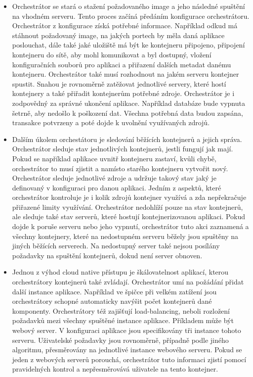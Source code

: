 \begin{itemize}
\item Orchestrátor se stará o stažení požadovaného image a jeho následné spuštění \linebreak na vhodném serveru. Tento proces začíná předáním konfigurace orchestrátoru. Orchestrátor z konfigurace získá potřebné informace. Například odkud má stáhnout požadovaný image, na jakých portech by měla daná aplikace poslouchat, dále také jaké uložiště má být ke kontejneru připojeno, připojení kontejneru \linebreak do sítě, aby mohl komunikovat a byl dostupný, vložení konfiguračních souborů pro aplikaci a přiřazení dalších metadat danému kontejneru. Orchestrátor také musí rozhodnout na jakém serveru kontejner spustit. Snahou je rovnoměrně zatěžovat jednotlivé servery, které hostí kontejnery a také přiřadit kontejnerům potřebné zdroje. Orchestrátor je i zodpovědný za správné ukončení aplikace. Například databáze bude vypnuta šetrně, aby nedošlo k poškození dat. Všechna potřebná data budou zapsána, transakce potvrzeny a poté dojde k uvolnění využívaných zdrojů.
\item Dalším úkolem orchestátoru je sledování běžících kontejnerů a jejich správa. Orchestrátor sleduje stav jednotlivých kontejnerů, jestli fungují jak mají. Pokud se například aplikace uvnitř kontejneru zastaví, kvůli chybě, orchestrátor to musí zjistit a namísto starého kontejneru vytvořit nový. Orchestrátor sleduje jednotlivé zdroje a udržuje takový stav jaký je definovaný v konfiguraci pro danou aplikaci. Jedním z aspektů, které orchestrátor kontroluje je i kolik zdrojů kontejner využívá a zda nepřekračuje přiřazené limity využívání. 
Orchestrátor nedohlíží pouze na stav kontejnerů, ale sleduje také stav serverů, které hostují kontejnerizovanou aplikaci. Pokud dojde k poruše serveru nebo jeho vypnutí, orchestrátor tuto akci zaznamená a všechny kontejnery, které na nedostupném serveru běžely jsou spuštěny na jiných běžících serverech. Na nedostupný server také nejsou posílány požadavky na spuštění kontejnerů, dokud není server obnoven.
\item Jednou z výhod cloud native přístupu je škálovatelnost aplikací, kterou orchestrátory kontejnerů také zvládají. Orchestrátor umí na požádání přidat další instance aplikace. Například ve špičce při velkém zatížení jsou orchestrátory schopné automaticky navýšit počet kontejnerů dané komponenty. Orchestrátory též zajišťují load-balancing, neboli rozložení požadavků mezi všechny spuštěné instance aplikace. Příkladem může být webový server. V konfiguraci aplikace jsou specifikovány tři instance tohoto serveru. Uživatelské požadavky jsou rovnoměrně, případně podle jiného algoritmu, přesměrovány na jednotlivé instance webového serveru. Pokud se jeden z webových serverů porouchá, orchestrátor tuto informaci zjistí pomocí pravidelných kontrol a nepřesměrovává uživatele na tento kontejner. 


\end{itemize}

